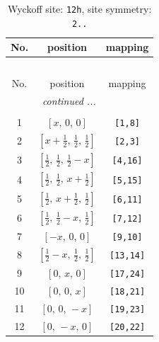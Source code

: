 \documentclass[fleqn,8pt]{jsarticle}
\begin{document}
\begin{longtable}{ccc}
\caption{Wyckoff site: {\tt 12h}, site symmetry: {\tt 2..}}
 \\
 \hline \hline
No. & position & mapping \\ \hline \endfirsthead

\multicolumn{2}{l}{\tablename\ \thetable{}} \\
 \hline \hline
No. & position & mapping \\ \hline \endhead

 \hline \hline
\multicolumn{2}{r}{\footnotesize\it continued ...} \\ \endfoot

 \hline \hline
\multicolumn{2}{r}{} \\ \endlastfoot

1 & $\left[ x,\, 0,\, 0 \right]$ & {\tt [1,8]} \\ \hline
2 & $\left[ x + \frac{1}{2},\, \frac{1}{2},\, \frac{1}{2} \right]$ & {\tt [2,3]} \\ \hline
3 & $\left[ \frac{1}{2},\, \frac{1}{2},\, \frac{1}{2} - x \right]$ & {\tt [4,16]} \\ \hline
4 & $\left[ \frac{1}{2},\, \frac{1}{2},\, x + \frac{1}{2} \right]$ & {\tt [5,15]} \\ \hline
5 & $\left[ \frac{1}{2},\, x + \frac{1}{2},\, \frac{1}{2} \right]$ & {\tt [6,11]} \\ \hline
6 & $\left[ \frac{1}{2},\, \frac{1}{2} - x,\, \frac{1}{2} \right]$ & {\tt [7,12]} \\ \hline
7 & $\left[ - x,\, 0,\, 0 \right]$ & {\tt [9,10]} \\ \hline
8 & $\left[ \frac{1}{2} - x,\, \frac{1}{2},\, \frac{1}{2} \right]$ & {\tt [13,14]} \\ \hline
9 & $\left[ 0,\, x,\, 0 \right]$ & {\tt [17,24]} \\ \hline
10 & $\left[ 0,\, 0,\, x \right]$ & {\tt [18,21]} \\ \hline
11 & $\left[ 0,\, 0,\, - x \right]$ & {\tt [19,23]} \\ \hline
12 & $\left[ 0,\, - x,\, 0 \right]$ & {\tt [20,22]} \\
\end{longtable}
\renewcommand{\arraystretch}{1.2}
\end{document}

